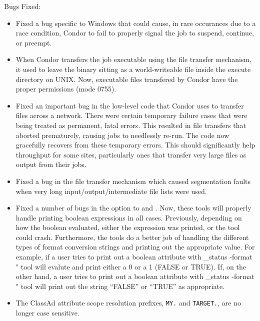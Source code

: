 \noindent Bugs Fixed:

\begin{itemize}

\item Fixed a bug specific to Windows that could cause, in rare occurances
due to a race condition, Condor to fail to properly signal the job to
suspend, continue, or preempt.

\item When Condor transfers the job executable using the file transfer
  mechanism, it used to leave the binary sitting as a world-writeable
  file inside the execute directory on UNIX.
  Now, executable files transfered by Condor have the proper
  permissions (mode 0755).

\item Fixed an important bug in the low-level code that Condor uses to
  transfer files across a network.
  There were certain temporary failure cases that were being treated
  as permanent, fatal errors.
  This resulted in file transfers that aborted prematurely, causing
  jobs to needlessly re-run.
  The code now gracefully recovers from these temporary errors.
  This should significantly help throughput for some sites,
  particularly ones that transfer very large files as output from
  their jobs.
 
\item Fixed a bug in the file transfer mechanism which caused
  segmentation faults when very long input/output/intermediate file
  lists were used.

\item Fixed a number of bugs in the  option to 
  and .
  Now, these tools will properly handle printing boolean expressions
  in all cases.
  Previously, depending on how the boolean evaluated, either the
  expression was printed, or the tool could crash.
  Furthermore, the tools do a better job of handling the different 
  types of format conversion strings and printing out the appropriate
  value.
  For example, if a user tries to print out a boolean attribute with
  \verb@condor_status -format "%d\n" HasFileTransfer@, the
   tool will evalute  and print
  either a 0 or a 1 (FALSE or TRUE).
  If, on the other hand, a user tries to print out a boolean attribute
  with \verb@condor_status -format "%s\n" HasFileTransfer@, the
   tool will print out the string ``FALSE'' or ``TRUE''
  as appropriate.

\item The ClassAd attribute scope resolution prefixes, \texttt{MY.} and
\texttt{TARGET.}, are no longer case sensitive.


\end{itemize}
